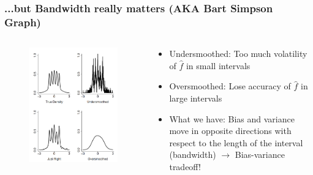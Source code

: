 \documentclass[aspectratio=169]{beamer}
\begin{document}
\begin{frame}
\frametitle{...but Bandwidth really matters (AKA Bart Simpson Graph)}
\begin{columns}[T]
\begin{column}{.49\textwidth}
\begin{figure}[H]
\centering
\includegraphics[width=.7\textwidth, keepaspectratio]{smoothing.png}
\end{figure}
\end{column}
\begin{column}{.49\textwidth}
\begin{itemize}
\bigskip
\item Undersmoothed: Too much volatility of $\hat{f}$ in small intervals
\bigskip
\item Oversmoothed: Lose accuracy of $\hat{f}$ in large intervals
\bigskip
\item What we have: Bias and variance move in opposite directions with respect to the length of the interval (bandwidth) $\to$ Bias-variance tradeoff!
\end{itemize}
\end{column}
\end{columns}
\end{frame}
\end{document}
